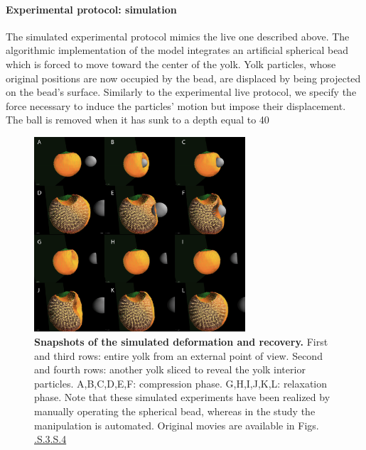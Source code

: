 \paragraph{Experimental protocol: simulation}


The simulated experimental protocol mimics the live one described above. The algorithmic implementation of the model integrates an artificial spherical bead which is forced to move toward the center of the yolk. Yolk particles, whose original positions are now occupied by the bead, are displaced by being projected on the bead's surface. Similarly to the experimental live protocol, we specify the force necessary to induce the particles' motion but impose their displacement. The ball is removed when it has sunk to a depth equal to 40%
\begin{figure}
\begin{center}
\includegraphics[width=0.7\textwidth]{../../images/Cases_Studies/Case_0_Yolk/simulation_example2.png}
\end{center}
\caption{\textbf{Snapshots of the simulated deformation and recovery.} First and third rows: entire yolk from an external point of view. Second and fourth rows: another yolk sliced to reveal the yolk interior particles. A,B,C,D,E,F: compression phase. G,H,I,J,K,L: relaxation phase.  Note that these simulated experiments have been realized by manually operating the spherical bead, whereas in the study the manipulation is automated. Original movies are available in Figs. \href{http://public.iscpif.fr/~delile/morphogenesis/manuscript/pragma/figure.html?name=Case_0_Yolk_yolk_external}{.S.3}\href{http://public.iscpif.fr/~delile/morphogenesis/manuscript/pragma/figure.html?name=Case_0_Yolk_yolk_relaxation_cut}{.S.4}}
\label{Case_0_Yolk_simulation_example}
\end{figure}


